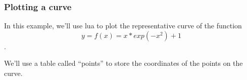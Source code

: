 

\subsubsection{Plotting a curve} %
\label{ssub:plotting_a_curve}
In this example, we'll use lua to plot the representative curve of the function 
\[ y = f(x) = x*exp(-x^2)+1\].

We'll use a table called “points” to store the coordinates of the points on the curve. 


\makeatletter\let\percentchar\@percentchar\makeatother
{}

\def\tkzval#1{%
\directlua{%
  local expr = [[\tkzfct]] 
  local f = load (("
        return function (x)
            return (\percentchar s)
        end"):format (expr), nil, 't', math) ()
tex.print(f(#1)) %
}}

\def\tkzcalcval(#1,#2,#3,#4,#5){%
\directlua{
local min, max, nb = #2, #3, #4 %
local expr = [[#1]]
#5 = {}
local f = load (("return function (x) return (\percentchar s) end"):format (expr), nil, 't', math) ()
for t = min,max,(max-min)/nb  do
local x = checknumber(t)
local y = checknumber(f(t))
 if (y==math.huge or y==-math.huge ) then tex.print("problem") end
    table.insert (#5, "("..x..","..y..")")  
 end}}

\def\tkzfct{x*exp(-x^2)+1}


